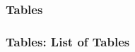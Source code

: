 \begin{frame}[fragile]
\frametitle{Tables}

\end{frame}


\begin{frame}[fragile]
\frametitle{Tables: List of Tables}
    
\end{frame}